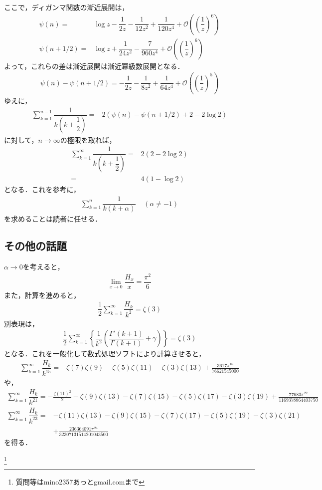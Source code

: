 \documentclass[12pt]{jsarticle}
\begin{document}
ここで，ディガンマ関数の漸近展開は，
\begin{align*}
\psi(n) =& \log z - \dfrac{1}{2z} - \dfrac{1}{12z^2} + \dfrac{1}{120z^4} + \mathcal{O}\left( \left( \dfrac{1}{z} \right)^6 \right) \\
\psi(n+1/2) =& \log z + \dfrac{1}{24z^2} - \dfrac{7}{960z^4} + \mathcal{O}\left( \left( \dfrac{1}{z} \right)^6 \right)
\end{align*}
よって，これらの差は漸近展開は漸近冪級数展開となる．
\begin{align*}
\psi(n) - \psi(n+1/2) = - \dfrac{1}{2z} - \dfrac{1}{8z^2} + \dfrac{1}{64z^4} + \mathcal{O}\left( \left( \dfrac{1}{z} \right)^5 \right)
\end{align*}
ゆえに，
\begin{align*}
\sum_{k=1}^{n-1}\dfrac{1}{k\left(k+\dfrac{1}{2}\right)} =& 2 \left( \psi(n) - \psi\left( n + 1/2 \right) + 2 - 2\log 2 \right)
\end{align*}
に対して，$n \to \infty$の極限を取れば，
\begin{align*}
\sum_{k=1}^{\infty}\dfrac{1}{k\left(k+\dfrac{1}{2}\right)} =& 2 \left( 2 - 2\log 2 \right) \\
=& 4(1 - \log 2)
\end{align*}
となる．これを参考に，
\begin{align*}
\sum_{k=1}^{n} \dfrac{1}{k(k+\alpha)} \ \ \ \ \ (\alpha \neq -1)
\end{align*}
を求めることは読者に任せる．
\subsection*{その他の話題}
$\alpha \to 0$を考えると，
\begin{align*}
\lim_{x \to 0}\dfrac{H_{x}}{x} = \dfrac{\pi^2}{6}
\end{align*}
また，計算を進めると，
\begin{align*}
\dfrac{1}{2}\sum_{k=1}^{\infty}\dfrac{H_{k}}{k^2} = \zeta(3)
\end{align*}
別表現は，
\begin{align*}
\dfrac{1}{2}\sum_{k=1}^{\infty} \left\{ \dfrac{1}{k^2}\left( \dfrac{\Gamma'(k+1)}{\Gamma(k+1)} + \gamma \right) \right\} = \zeta(3)
\end{align*}
となる．これを一般化して数式処理ソフトにより計算させると，
\begin{align*}
\sum_{k=1}^{\infty}\dfrac{H_{k}}{k^{15}}=-\zeta (7) \zeta (9)-\zeta (5) \zeta (11)-\zeta (3) \zeta(13)+\frac{3617 \pi ^{16}}{76621545000}
\end{align*}
や，
\begin{align*}
\sum_{k=1}^{\infty}\dfrac{H_{k}}{k^{21}}=-\frac{\zeta (11)^2}{2}-\zeta (9) \zeta (13)-\zeta (7) \zeta (15)-\zeta (5) \zeta(17)-\zeta (3) \zeta (19)+\frac{77683 \pi ^{22}}{1169378864403750}
\end{align*}
\begin{align*}
\sum_{k=1}^{\infty}\dfrac{H_{k}}{k^{23}}=&-\zeta (11) \zeta (13)-\zeta (9) \zeta (15)-\zeta (7) \zeta (17)-\zeta (5) \zeta(19)-\zeta (3) \zeta (21) \\
&+\frac{236364091 \pi ^{24}}{32307131514201043500}
\end{align*}
を得る．

\footnote[0]{
質問等はmino2357あっとgmail.comまで
}

\thispagestyle{empty}
\end{document}
